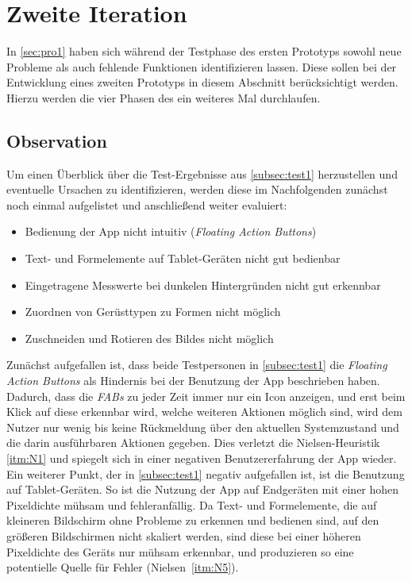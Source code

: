 \section{Zweite Iteration}\label{sec:pro2}

In \autoref{sec:pro1} haben sich während der Testphase des ersten Prototyps sowohl neue Probleme als auch fehlende Funktionen identifizieren lassen.
Diese sollen bei der Entwicklung eines zweiten Prototyps in diesem Abschnitt berücksichtigt werden. 
Hierzu werden die vier Phasen des \hcdp{} ein weiteres Mal durchlaufen.

\subsection{Observation}
Um einen Überblick über die Test-Ergebnisse aus \autoref{subsec:test1} herzustellen und eventuelle Ursachen zu identifizieren, werden diese im Nachfolgenden zunächst noch einmal aufgelistet und anschließend weiter evaluiert:

\begin{itemize}
  \item Bedienung der App nicht intuitiv (\emph{Floating Action Buttons})
  \item Text- und Formelemente auf Tablet-Geräten nicht gut bedienbar
  \item Eingetragene Messwerte bei dunkelen Hintergründen nicht gut erkennbar
  \item Zuordnen von Gerüsttypen zu Formen nicht möglich
  \item Zuschneiden und Rotieren des Bildes nicht möglich
\end{itemize}

\noindent
Zunächst aufgefallen ist, dass beide Testpersonen in \autoref{subsec:test1} die \emph{Floating Action Buttons} als Hindernis bei der Benutzung der App beschrieben haben.
Dadurch, dass die \emph{FABs} zu jeder Zeit immer nur ein Icon anzeigen, und erst beim Klick auf diese erkennbar wird, welche weiteren Aktionen möglich sind, wird dem Nutzer nur wenig bis keine Rückmeldung über den aktuellen Systemzustand und die darin ausführbaren Aktionen gegeben.
Dies verletzt die Nielsen-Heuristik \autoref{itm:N1} und spiegelt sich in einer negativen Benutzererfahrung der App wieder. \\

Ein weiterer Punkt, der in \autoref{subsec:test1} negativ aufgefallen ist, ist die Benutzung auf Tablet-Geräten.
So ist die Nutzung der App auf Endgeräten mit einer hohen Pixeldichte mühsam und fehleranfällig.
Da Text- und Formelemente, die auf kleineren Bildschirm ohne Probleme zu erkennen und bedienen sind, auf den größeren Bildschirmen nicht skaliert werden, sind diese bei einer höheren Pixeldichte des Geräts nur mühsam erkennbar, und produzieren so eine potentielle Quelle für Fehler (Nielsen~\autoref{itm:N5}).\\ 


